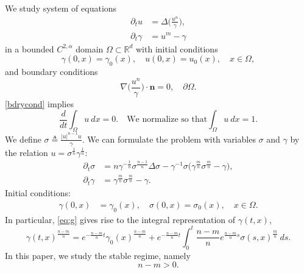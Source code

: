 \documentclass[a4paper,11pt]{article}
\theoremstyle{remark}
\begin{document}
We study system of equations
\begin{equation}\label{ug_system}
\begin{aligned}
 \partial_t u &= \Delta \Big(\frac{u^n}{\gamma}\Big),\\
 \partial_t \gamma &= u^m - \gamma
\end{aligned}
\end{equation}
in a bounded $C^{2,\alpha}$ domain $\Omega\subset \mathbb{R}^d$
with initial conditions
\begin{equation}
 \gamma(0,x)=\gamma_0(x), \quad u(0,x)=u_0(x), \quad x\in \Omega,
\end{equation}
and boundary conditions
\begin{equation}
 \nabla\Big(\frac{u^n}{\gamma}\Big)\cdot \mathbf{n} = 0, \quad \partial\Omega. \label{bdrycond}
\end{equation}
\eqref{bdrycond} implies
\begin{equation}
 \frac{d}{dt} \int_\Omega u \: dx = 0. \quad \text{We normalize so that}  \int_\Omega u \: dx=1.
\end{equation}
We define $\sigma\triangleq\frac{|u|^{n-1}u}{\gamma}$. 
We can formulate the problem with variables $\sigma$ and $\gamma$ by the relation 
$\displaystyle u = \sigma^{\frac{1}{n}}\gamma^{\frac{1}{n}}$:
\begin{align}
 \partial_t \sigma &= n\gamma^{-\frac{1}{n}}\sigma^{\frac{n-1}{n}} \Delta \sigma - \gamma^{-1}\sigma\Big(\gamma^{\frac{m}{n}}\sigma^{\frac{m}{n}}-\gamma\Big) \label{eq:s},\\
 \partial_t \gamma &= \gamma^{\frac{m}{n}}\sigma^{\frac{m}{n}} - \gamma. \label{eq:g}
\end{align}
Initial conditions:
\begin{align}
 \gamma(0,x)&=\gamma_0(x), \quad \sigma(0,x)=\sigma_0(x), \quad x\in \Omega. \label{initcond}
\end{align}
In particular, \eqref{eq:g} gives rise to the integral representation of $\gamma(t,x)$,
\begin{equation}
 \gamma(t,x)^{\frac{n-m}{n}} = e^{-\frac{n-m}{n}t}\gamma_0(x)^{\frac{n-m}{n}} + e^{-\frac{n-m}{n}t}\int_0^t \frac{n-m}{n} e^{\frac{n-m}{n}s} \sigma(s,x)^{\frac{m}{n}} \: ds. \label{eq:rep}
\end{equation}
In this paper, we study the stable regime, namely
\begin{equation}
 n-m>0. \label{stable}
\end{equation}
\end{document}

